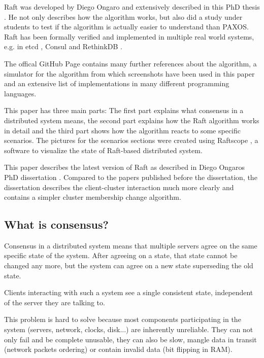Raft was developed by Diego Ongaro and extensively described in this PhD thesis \cite{raft_phd_thesis}. He not only describes how the algorithm works, but also did a study under students to test if the algorithm is actually easier to understand than PAXOS. Raft has been formally verified \cite{raft_proof} and implemented in multiple real world systems, e.g. in etcd \cite{etcd_raft}, Consul \cite{consul_raft} and RethinkDB \cite{rethinkdb_raft}.

The offical GitHub Page \cite{raft_github} contains many further references about the algorithm, a simulator for the algorithm from which screenshots have been used in this paper and an extensive list of implementations in many different programming languages.

This paper has three main parts: The first part explains what consensus in a distributed system means, the second part explains how the Raft algorithm works in detail and the third part shows how the algorithm reacts to some specific scenarios.
The pictures for the scenarios sections were created using Raftscope \cite{raftscope}, a software to visualize the state of Raft-based distributed system.

This paper describes the latest version of Raft as described in Diego Ongaros PhD dissertation \cite{raft_phd_thesis}. Compared to the papers published before the dissertation, the dissertation describes the client-cluster interaction much more clearly and contains a simpler cluster membership change algorithm.

\subsection{What is consensus?}

Consensus in a distributed system means that multiple servers agree on the same specific state of the system. After agreeing on a state, that state cannot be changed any more, but the system can agree on a new state superseding the old state.

Clients interacting with such a system see a single consistent state, independent of the server they are talking to.

This problem is hard to solve because most components participating in the system (servers, network, clocks, disk...) are inherently unreliable. They can not only fail and be complete unusable, they can also be slow, mangle data in transit (network packets ordering) or contain invalid data (bit flipping in RAM).

